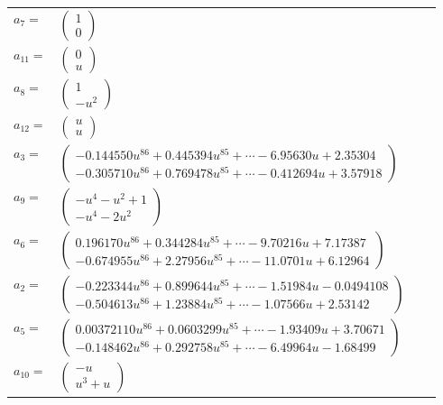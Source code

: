 \documentclass[1p]{elsarticle_modified}
\theoremstyle{definition}
\begin{document}
\begin{tabular}{m{7pt} m{180pt} m{7pt} m{180pt} }
\flushright $a_{7}=$&$\begin{pmatrix}1\\0\end{pmatrix}$ \\
\flushright $a_{11}=$&$\begin{pmatrix}0\\u\end{pmatrix}$ \\
\flushright $a_{8}=$&$\begin{pmatrix}1\\- u^2\end{pmatrix}$ \\
\flushright $a_{12}=$&$\begin{pmatrix}u\\u\end{pmatrix}$ \\
\flushright $a_{3}=$&$\begin{pmatrix}-0.144550 u^{86}+0.445394 u^{85}+\cdots-6.95630 u+2.35304\\-0.305710 u^{86}+0.769478 u^{85}+\cdots-0.412694 u+3.57918\end{pmatrix}$ \\
\flushright $a_{9}=$&$\begin{pmatrix}- u^4- u^2+1\\- u^4-2 u^2\end{pmatrix}$ \\
\flushright $a_{6}=$&$\begin{pmatrix}0.196170 u^{86}+0.344284 u^{85}+\cdots-9.70216 u+7.17387\\-0.674955 u^{86}+2.27956 u^{85}+\cdots-11.0701 u+6.12964\end{pmatrix}$ \\
\flushright $a_{2}=$&$\begin{pmatrix}-0.223344 u^{86}+0.899644 u^{85}+\cdots-1.51984 u-0.0494108\\-0.504613 u^{86}+1.23884 u^{85}+\cdots-1.07566 u+2.53142\end{pmatrix}$ \\
\flushright $a_{5}=$&$\begin{pmatrix}0.00372110 u^{86}+0.0603299 u^{85}+\cdots-1.93409 u+3.70671\\-0.148462 u^{86}+0.292758 u^{85}+\cdots-6.49964 u-1.68499\end{pmatrix}$ \\
\flushright $a_{10}=$&$\begin{pmatrix}- u\\u^3+u\end{pmatrix}$ \\

\end{tabular}
\end{document}

